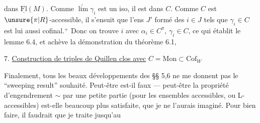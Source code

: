 dans $\underline{\mathrm{Fl}}(M)$. Comme $\underrightarrow{\lim}\gamma_i$   est un iso, il est dans $C$.  Comme $C$ est $\unsure{\pi|R}$-accessible, il s'ensuit que l'ens $J'$ formé des  $i\in J$ tels que $\gamma_i\in C$ est lui aussi cofinal.$^{+}$
 Donc on trouve $i$ avec $\alpha_i\in C^\pi$, $\gamma_i\in C$, ce qui établit le lemme 6.4, et achève la démonstration du théorème 6.1,


7. \uline{Construction de triples de Quillen clos avec} $C=\mathrm{Mon}\subset\mathrm{Cof}_W$

Finalement, tous les beaux développements des §§ 5,6 ne me donnent pas le ``sweeping result'' souhaité. Peut-être est-il faux --- peut-être la propriété d'engendrement $\sim$ par une petite partie (pour les ensembles accessibles, ou L-accessibles) est-elle beaucoup plus  satisfaite, que je ne l'aurais imaginé. Pour bien faire, il faudrait que je traite jusqu'au
